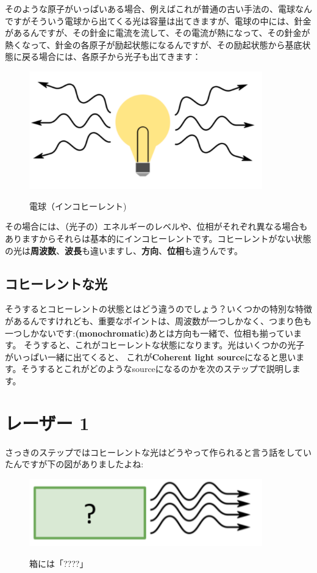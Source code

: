 そのような原子がいっぱいある場合、例えばこれが普通の古い手法の、電球なんですがそういう電球から出てくる光は容量は出てきますが、電球の中には、針金があるんですが、その針金に電流を流して、その電流が熱になって、その針金が熱くなって、針金の各原子が励起状態になるんですが、その励起状態から基底状態に戻る場合には、各原子から光子も出てきます：
\begin{figure}[H]
    \centering
    \includegraphics[width=0.9\textwidth]{lesson5/lightbulb.pdf}
    \label{図: 1}
    \caption{電球（インコヒーレント)}
\end{figure}
その場合には、（光子の）エネルギーのレベルや、位相がそれぞれ異なる場合もありますからそれらは基本的にインコヒーレントです。コヒーレントがない状態の光は\textbf{周波数}、\textbf{波長}も違いますし、\textbf{方向}、\textbf{位相}も違うんです。

\subsection{コヒーレントな光}
そうするとコヒーレントの状態とはどう違うのでしょう？いくつかの特別な特徴があるんですけれども、重要なポイントは、周波数が一つしかなく、つまり色も一つしかないです:\textbf{(monochromatic)}あとは方向も一緒で、位相も揃っています。
そうすると、これがコヒーレントな状態になります。光はいくつかの光子がいっぱい一緒に出てくると、 これが\textbf{Coherent light source}になると思います。そうするとこれがどのようなsourceになるのかを次のステップで説明します。


\section{レーザー 1}
さっきのステップではコヒーレントな光はどうやって作られると言う話をしていたんですが下の図がありましたよね:
\begin{figure}[H]
    \centering
    \includegraphics[width=0.9\textwidth]{lesson5/question_box.pdf}
    \label{図: 1}
    \caption{箱には「????」}
\end{figure}

